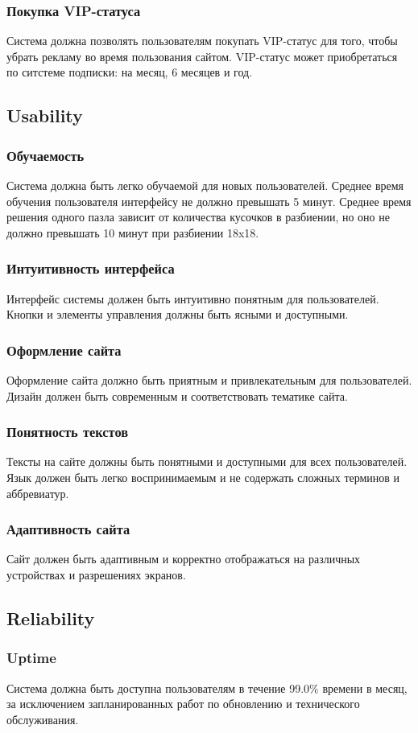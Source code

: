 \documentclass[12pt]{article}
\begin{document}
\subsubsection{Покупка VIP-статуса}
Система должна позволять пользователям покупать VIP-статус для того, чтобы убрать рекламу во время пользования сайтом. VIP-статус может приобретаться по ситстеме подписки: на месяц, 6 месяцев и год.
\subsection{Usability}
\subsubsection{Обучаемость}
Система должна быть легко обучаемой для новых пользователей. Среднее время обучения пользователя интерфейсу не должно превышать 5 минут. Среднее время решения одного пазла зависит от количества кусочков в разбиении, но оно не должно превышать 10 минут при разбиении 18x18.
\subsubsection{Интуитивность интерфейса}
Интерфейс системы должен быть интуитивно понятным для пользователей. Кнопки и элементы управления должны быть ясными и доступными.
\subsubsection{Оформление сайта}
Оформление сайта должно быть приятным и привлекательным для пользователей. Дизайн должен быть современным и соответствовать тематике сайта.
\subsubsection{Понятность текстов}
Тексты на сайте должны быть понятными и доступными для всех пользователей. Язык должен быть легко воспринимаемым и не содержать сложных терминов и аббревиатур.
\subsubsection{Адаптивность сайта}
Сайт должен быть адаптивным и корректно отображаться на различных устройствах и разрешениях экранов.
\subsection{Reliability}
\subsubsection{Uptime}
Система должна быть доступна пользователям в течение 99.0\% времени в месяц, за исключением запланированных работ по обновлению и технического обслуживания.
\end{document}

